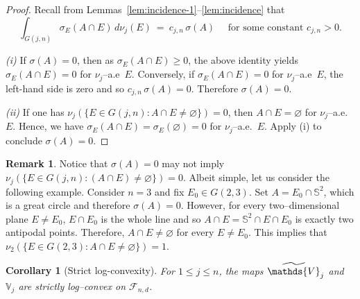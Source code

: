 \documentclass[11pt]{article}
\newtheorem{corollary}[theorem]{Corollary}
\theoremstyle{definition}
\numberwithin{equation}{section}
\newtheorem{remark}[theorem]{Remark}
\newcommand{\Sph}{\mathbb{S}}        %
\newcommand{\cF}{\mathcal{F}}
\newcommand{\Gr}[2]{G(#1,#2)}        %
\newcommand{\opV}{\mathds{V}}       %
\begin{document}
\begin{proof}
Recall from Lemmas~\ref{lem:incidence-1}--\ref{lem:incidence} that 
\[
\int_{G(j,n)} \sigma_E(A \cap E)\,d\nu_j(E)\ =\ c_{j,n}\,\sigma(A) \quad 
\text{ for some constant $c_{j, n} > 0$.}
\]

\textit{(i)} 
If $\sigma(A)=0$, then as $\sigma_E(A \cap E) \geq 0$, the above identity yields
$\sigma_E(A \cap E)=0$ for $\nu_j$–a.e\ $E$.
Conversely, if $\sigma_E(A \cap E)=0$ for $\nu_j$–a.e\ $E$, the left-hand
side is zero and so $c_{j,n}\,\sigma(A)=0$.
Therefore $\sigma(A)=0$.

\medskip

\textit{(ii)} If one has $\nu_j(\{E \in \Gr{j}{n}: A\cap E\neq\varnothing\})=0$, then $A\cap E=\varnothing$ for $\nu_j$–a.e.\ $E$.
Hence, we have $\sigma_E(A \cap E) =\sigma_E(\varnothing) = 0$ for $\nu_j$–a.e.\ $E$. Apply (i) to conclude $\sigma(A)=0$.
\end{proof}

\begin{remark}\normalfont
Notice that $\sigma(A)=0$ may not imply $\nu_j (\{E \in \Gr{j}{n}: (A\cap E)\neq\varnothing\})=0$.
Albeit simple, let us consider the following example.
Consider $n = 3$ and fix $E_0 \in G(2, 3)$.
Set $A = E_0 \cap \Sph^{2}$, which is a great circle and therefore $\sigma(A) = 0$.
However, for every two--dimensional plane $E \neq E_0$, $E \cap E_0$ is the whole line and so $A \cap E = \Sph^2 \cap E \cap E_0$ is exactly two antipodal points. 
Therefore, $A \cap E \neq \varnothing$ for every $E \neq E_0$. 
This implies that $\nu_2(\{ E \in G(2, 3) : A \cap E \neq \varnothing \}) = 1$.
\end{remark}

\begin{corollary}[Strict log-convexity]\label{cor:strict-logconvex}
For $1\le j \leq n$, the maps $\widetilde\opV_j$ and $\opV_j$ are strictly log--convex on $\cF_{n,d}$. 
\end{corollary}
\end{document}
